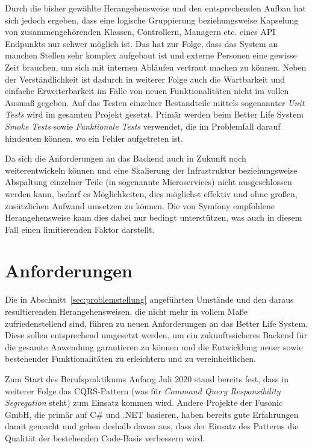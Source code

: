 \documentclass[a4paper,12pt,twoside]{scrreprt}
\begin{document}
Durch die bisher gewählte Herangehensweise und den entsprechenden Aufbau hat sich jedoch ergeben, dass eine logische Gruppierung beziehungsweise Kapselung von zusammengehörenden Klassen, Controllern, Managern etc. eines API Endpunkts nur schwer möglich ist. Das hat zur Folge, dass das System an manchen Stellen sehr komplex aufgebaut ist und externe Personen eine gewisse Zeit brauchen, um sich mit internen Abläufen vertraut machen zu können. Neben der Verständlichkeit ist dadurch in weiterer Folge auch die Wartbarkeit und einfache Erweiterbarkeit im Falle von neuen Funktionalitäten nicht im vollen Ausmaß gegeben. Auf das Testen einzelner Bestandteile mittels sogenannter \textit{Unit Tests} wird im gesamten Projekt gesetzt. Primär werden beim Better Life System \textit{Smoke Tests} sowie \textit{Funktionale Tests} verwendet, die im Problemfall darauf hindeuten können, wo ein Fehler aufgetreten ist.

Da sich die Anforderungen an das Backend auch in Zukunft noch weiterentwickeln können und eine Skalierung der Infrastruktur beziehungsweise Abspaltung einzelner Teile (in sogenannte Microservices) nicht ausgeschlossen werden kann, bedarf es Möglichkeiten, dies möglichst effektiv und ohne großen, zusätzlichen Aufwand umsetzen zu können. Die von Symfony empfohlene Herangehensweise kann dies dabei nur bedingt unterstützen, was auch in diesem Fall einen limitierenden Faktor darstellt.

\section{Anforderungen}
\label{sec:anforderungen}
Die in Abschnitt~\ref{sec:problemstellung} angeführten Umstände und den daraus resultierenden Herangehensweisen, die nicht mehr in vollem Maße zufriedenstellend sind, führen zu neuen Anforderungen an das Better Life System. Diese sollen entsprechend umgesetzt werden, um ein zukunftssicheres Backend für die gesamte Anwendung garantieren zu können und die Entwicklung neuer sowie bestehender Funktionalitäten zu erleichtern und zu vereinheitlichen.

\medskip

Zum Start des Berufspraktikums Anfang Juli 2020 stand bereits fest, dass in weiterer Folge das CQRS-Pattern (was für \textit{Command Query Responsibility Segregation} steht) zum Einsatz kommen wird. Andere Projekte der Fusonic GmbH, die primär auf C\# und .NET basieren, haben bereits gute Erfahrungen damit gemacht und gehen deshalb davon aus, dass der Einsatz des Patterns die Qualität der bestehenden Code-Basis verbessern wird.
\end{document}
